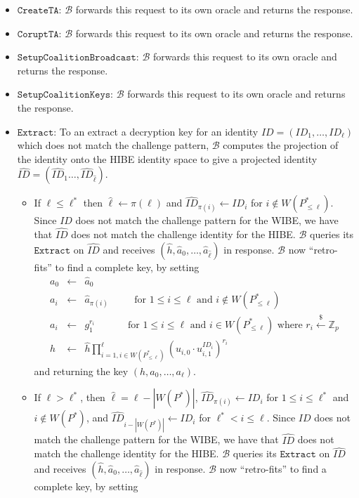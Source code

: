 \documentclass{llncs}
\newcommand{\B}{\mathcal{B}}
\newcommand{\ID}{\mathit{ID}}
\newcommand{\getsr}{\stackrel{{\scriptscriptstyle\$}}{\gets}}
\begin{document}
\begin{enumerate}
\begin{itemize}
    \item $\texttt{CreateTA}$: $\B$ forwards this request to its own oracle and returns the response.
    \item $\texttt{CoruptTA}$: $\B$ forwards this request to its own oracle and returns the response.
    \item $\texttt{SetupCoalitionBroadcast}$: $\B$ forwards this request to its own oracle and returns the response.
    \item $\texttt{SetupCoalitionKeys}$: $\B$ forwards this request to its own oracle and returns the response.
    \item $\texttt{Extract}$: To an extract a decryption key for an identity $\ID=(\ID_{1},\ldots,\ID_{\ell})$ which does not match the challenge pattern, $\B$ computes the projection of the identity onto the HIBE identity space to give a projected identity $\hat{\ID}=(\hat{\ID}_{1}\ldots, \hat{\ID}_{\hat{\ell}})$.
        \begin{itemize}
        \item If $\ell \leq \ell^{*}$ then $\hat{\ell} \gets \pi(\ell)$ and $\hat{\ID}_{\pi(i)} \gets \ID_{i}$ for $i\notin W(P^{*}_{\leq \ell})$. Since $\ID$ does not match the challenge pattern for the WIBE, we have that $\hat{\ID}$ does not match the challenge identity for the HIBE. $\B$ queries its $\texttt{Extract}$ on $\hat{\ID}$ and receives $(\hat{h},\hat{a}_{0},\ldots,\hat{a}_{\hat{\ell}})$ in response. $\B$ now ``retro-fits'' to find a complete key, by setting
            \begin{displaymath}
            \begin{array}{rcl}
            a_{0} &\gets& \hat{a}_{0}\\
            a_{i} &\gets& \hat{a}_{\pi(i)} \qquad \;\mbox{ for }1\leq i\leq \ell \mbox{ and } i\notin W(P^{*}_{\leq \ell})\\
            a_{i} &\gets& g_{1}^{r_{i}} \qquad \quad \mbox{ for }1\leq i\leq \ell \mbox{ and } i\in W(P^{*}_{\leq \ell})\mbox{ where } r_{i}\getsr \mathbb{Z}_{p}\\
            h &\gets& \hat{h} \prod_{i=1, i\in W(P^{*}_{\leq \ell})}^{\ell} (u_{i,0} \cdot u_{i,1}^{\ID_{i}})^{r_{i}}
            \end{array}
            \end{displaymath}
            and returning the key $(h,a_{0},\ldots,a_{\ell})$.
        \item If $\ell > \ell^{*}$, then $\hat{\ell} = \ell - |W(P^{*})|$, $\hat{\ID}_{\pi(i)} \gets \ID_{i}$ for $1\leq i\leq \ell^{*}$ and $i\notin W(P^{*})$, and $\hat{\ID}_{i-|W(P^{*})|} \gets \ID_{i}$ for $\ell^{*} < i\leq \ell$. Since $\ID$ does not match the challenge pattern for the WIBE, we have that $\hat{\ID}$ does not match the challenge identity for the HIBE. $\B$ queries its $\texttt{Extract}$ on $\hat{\ID}$ and receives $(\hat{h},\hat{a}_{0},\ldots,\hat{a}_{\hat{\ell}})$ in response. $\B$ now ``retro-fits'' to find a complete key, by setting

\end{itemize}
\end{itemize}
\end{enumerate}
\end{document}
